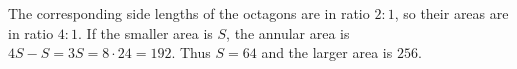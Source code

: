 The corresponding side lengths of the octagons are in ratio $2:1$, so their areas are in ratio $4:1$. If the smaller area is $S$, the annular area is $4S-S=3S=8\cdot24=192$. Thus $S=64$ and the larger area is $\boxed{256}$.
